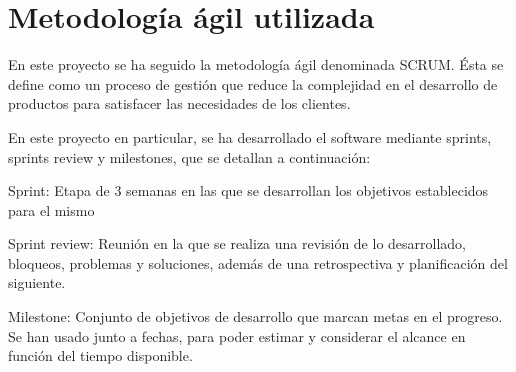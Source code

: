 \section{Metodología ágil utilizada}
En este proyecto se ha seguido la metodología ágil denominada SCRUM. Ésta se define como un proceso de gestión que reduce la complejidad en el desarrollo de productos para satisfacer las necesidades de los clientes.
\vspace{1em}
\par En este proyecto en particular, se ha desarrollado el software mediante sprints, sprints review y milestones, que se detallan a continuación:
\vspace{1em}
\par Sprint: Etapa de 3 semanas en las que se desarrollan los objetivos establecidos para el mismo
\vspace{1em}
\par Sprint review: Reunión en la que se realiza una revisión de lo desarrollado, bloqueos, problemas y soluciones, además de una retrospectiva y planificación del siguiente.
\vspace{1em}
\par Milestone: Conjunto de objetivos de desarrollo que marcan metas en el progreso. Se han usado junto a fechas, para poder estimar y considerar el alcance en función del tiempo disponible.

